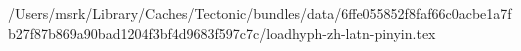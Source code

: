 /Users/msrk/Library/Caches/Tectonic/bundles/data/6ffe055852f8faf66c0acbe1a7fb27f87b869a90bad1204f3bf4d9683f597c7c/loadhyph-zh-latn-pinyin.tex